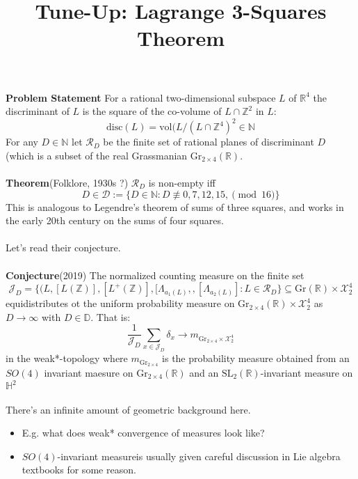 \documentclass[12pt]{article}
\title{Tune-Up: Lagrange 3-Squares Theorem}
\date{}
\begin{document}
\sffamily

\maketitle

{\fontsize{16pt}{16pt}\selectfont 

\noindent  \textbf{Problem Statement} For a rational two-dimensional subspace $L$ of $\mathbb{R}^4$ the discriminant of $L$ is the square of the co-volume of $L \cap \mathbb{Z}^2$ in $L$:
$$ \text{disc}(L) = \text{vol}(L / (L \cap \mathbb{Z}^4)^2 \in \mathbb{N} $$
For any $D \in \mathbb{N}$ let $\mathcal{R}_D$ be the finite set of rational planes of discriminant $D$ (which is a subset of the real Grassmanian 
$\text{Gr}_{2 \times 4}(\mathbb{R})$.\\ \\
\textbf{Theorem}(Folklore, 1930s ?) $\mathcal{R}_D$ is non-empty iff
$$ D \in \mathcal{D} := \big\{ D \in \mathbb{N} : D \not \equiv 0,7,12,15, \pmod {16} \big\} $$
This is analogous to Legendre's theorem of sums of three squares, and works in the early 20th century on the sums of four squares.  
\\ \\
Let's read their conjecture.   \\ \\
\textbf{Conjecture}(2019) The normalized counting measure on the finite set
$$ \mathcal{J}_D = 
\big\{ (L, [L(\mathbb{Z})], [L^+(\mathbb{Z})], [\Lambda_{a_1(L)},, [\Lambda_{a_2(L)}] : L \in \mathcal{R}_D \big\} \subseteq \text{Gr}(\mathbb{R}) \times \mathcal{X}_2^4 $$
equidistributes ot the uniform probability measure on $\text{Gr}_{2 \times 4} (\mathbb{R}) \times \mathcal{X}_2^4$ as $D \to \infty$ with $D \in \mathbb{D}$.  That is:
$$ 
\frac{1}{\mathcal{J}_D}
\sum_{x \in \mathcal{J}_D}
\delta_x \to m_{\text{Gr}_{2 \times 4} \times \mathcal{X}_2^4}  
$$ 
in the weak*-topology where $m_{\text{Gr}_{2 \times 4}}$ is the probability measure obtained from an $SO(4)$ invariant maesure on $\text{Gr}_{2 \times 4}(\mathbb{R})$ and an 
$\text{SL}_2(\mathbb{R})$-invariant measure on $\mathbb{H}^2$ \\ \\
There's an infinite amount of geometric background here.
\begin{itemize}
	\item E.g. what does weak* convergence of measures look like?
	\item $SO(4)$-invariant measureis usually given careful discussion in Lie algebra textbooks for some reason.

\end{itemize}}
\end{document}
